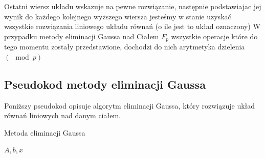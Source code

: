 \documentclass{article}
\begin{document}
 Ostatni wiersz układu wskazuje na pewne rozwiązanie, następnie podstawiajac jej wynik do każdego kolejnego wyższego wiersza jesteśmy w stanie uzyskać wszystkie rozwiązania liniowego układu równań (o ile jest to układ oznaczony)
\newline
\newline
W przypadku metody eliminacji Gaussa nad Ciałem \begin{math}  F_{p}  \end{math} wszystkie operacje które do tego momentu zostały przedstawione, dochodzi do nich arytmetyka dzielenia \begin{math}
    ( \mod p )
\end{math}

\newpage

\subsection{Pseudokod metody eliminacji Gaussa} \label{Pseudokod Metody eliminacji Gaussa}

Poniższy pseudokod opisuje algorytm eliminacji Gaussa, który rozwiązuje układ równań liniowych nad danym ciałem.

\begin{algorithm}[H]
\caption{Metoda eliminacji Gaussa}
\renewcommand{\algorithmicrequire}{\textbf{Wejście:}}
\begin{algorithmic}[1]
    \REQUIRE $A,b,x$
            \ENDFOR
        \ENDFOR
    \ENDFOR
{}
\ENDFOR
{}
\ENDFOR
\end{algorithmic}
\end{algorithm}


\newpage
\end{document}
